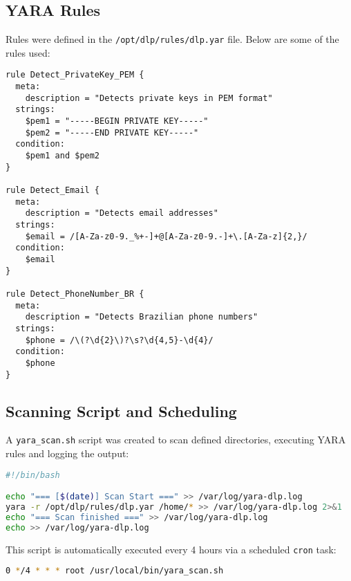 \documentclass[12pt]{report}
\begin{document}
\subsection*{YARA Rules}

Rules were defined in the \texttt{/opt/dlp/rules/dlp.yar} file. Below are some of the rules used:

\begin{lstlisting}[language=yara, caption={YARA Rules for Sensitive Data Detection}]
rule Detect_PrivateKey_PEM {
  meta:
    description = "Detects private keys in PEM format"
  strings:
    $pem1 = "-----BEGIN PRIVATE KEY-----"
    $pem2 = "-----END PRIVATE KEY-----"
  condition:
    $pem1 and $pem2
}

rule Detect_Email {
  meta:
    description = "Detects email addresses"
  strings:
    $email = /[A-Za-z0-9._%+-]+@[A-Za-z0-9.-]+\.[A-Za-z]{2,}/
  condition:
    $email
}

rule Detect_PhoneNumber_BR {
  meta:
    description = "Detects Brazilian phone numbers"
  strings:
    $phone = /\(?\d{2}\)?\s?\d{4,5}-\d{4}/
  condition:
    $phone
}
\end{lstlisting}

\subsection*{Scanning Script and Scheduling}

A \texttt{yara\_scan.sh} script was created to scan defined directories, executing YARA rules and logging the output:

\begin{lstlisting}[language=bash, caption={Excerpt from yara\_scan.sh Script}]
#!/bin/bash

echo "=== [$(date)] Scan Start ===" >> /var/log/yara-dlp.log
yara -r /opt/dlp/rules/dlp.yar /home/* >> /var/log/yara-dlp.log 2>&1
echo "=== Scan finished ===" >> /var/log/yara-dlp.log
echo >> /var/log/yara-dlp.log
\end{lstlisting}

This script is automatically executed every 4 hours via a scheduled \texttt{cron} task:

\begin{lstlisting}[language=bash, caption={Crontab Scheduling}]
0 */4 * * * root /usr/local/bin/yara_scan.sh
\end{lstlisting}
\end{document}
